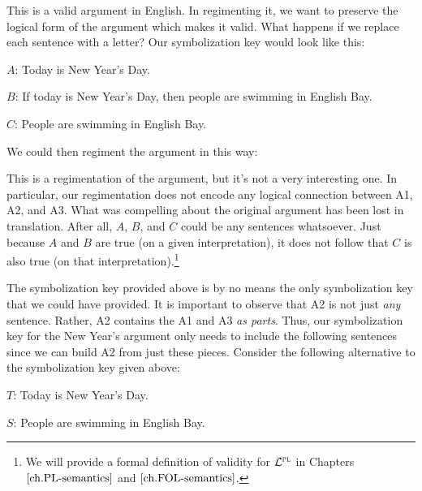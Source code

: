 \begin{earg}
\end{earg}

This is a valid argument in English.
In regimenting it, we want to preserve the logical form of the argument which makes it valid.
What happens if we replace each sentence with a letter? 
Our symbolization key would look like this:

\begin{ekey}
  \item[$A$:] Today is New Year's Day.
  \item[$B$:] If today is New Year's Day, then people are swimming in English Bay.
  \item[$C$:] People are swimming in English Bay.
\end{ekey}

We could then regiment the argument in this way:

\begin{earg}
\end{earg}

This is a regimentation of the argument, but it's not a very interesting one.
In particular, our regimentation does not encode any logical connection between A1, A2, and A3.
What was compelling about the original argument has been lost in translation.
After all, $A$, $B$, and $C$ could be any sentences whatsoever.
Just because $A$ and $B$ are true (on a given interpretation), it does not follow that $C$ is also true (on that interpretation).\footnote{We will provide a formal definition of validity for $\mathcal{L}^{\textsc{pl}}$ in Chapters $\ref{ch.PL-semantics}$ and $\ref{ch.FOL-semantics}$.}


The symbolization key provided above is by no means the only symbolization key that we could have provided.
It is important to observe that A2 is not just \emph{any} sentence.
Rather, A2 contains the A1 and A3 \emph{as parts}.
Thus, our symbolization key for the New Year's argument only needs to include the following sentences since we can build A2 from just these pieces.
Consider the following alternative to the symbolization key given above:

\begin{ekey}
\item[$T$:] Today is New Year's Day.
\item[$S$:] People are swimming in English Bay.
\end{ekey}

